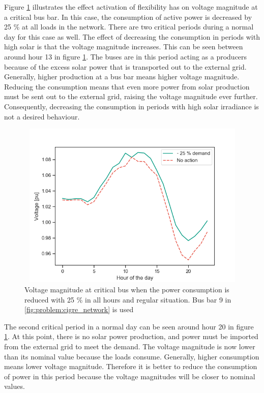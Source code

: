 \documentclass[class=book, crop=false, 11pt]{standalone}
\begin{document}
Figure \ref{fig:results:decrease_demand_voltage} illustrates the effect activation of flexibility has on voltage magnitude at a critical bus bar. In this case, the consumption of active power is decreased by 25 \% at all loads in the network. There are two critical periods during a normal day for this case as well. The effect of decreasing the consumption in periods with high solar is that the voltage magnitude increases. This can be seen between around hour 13 in figure \ref{fig:results:decrease_demand_voltage}. The buses are in this period acting as a producers because of the excess solar power that is transported out to the external grid. Generally, higher production at a bus bar means higher voltage magnitude. Reducing the consumption means that even more power from solar production must be sent out to the external grid, raising the voltage magnitude ever further. Consequently, decreasing the consumption in periods with high solar irradiance is not a desired behaviour. 

\begin{figure}[h]
    \center
\includegraphics[height=8cm, width=12cm]{figures/decrease_demand_voltage.png}
    \caption {Voltage magnitude at critical bus when the power consumption is reduced with 25 \% in all hours and regular situation. Bus bar 9 in \ref{fig:problem:cigre_network} is used}
    \label{fig:results:decrease_demand_voltage}
\end{figure}


The second critical period in a normal day can be seen around hour 20 in figure \ref{fig:results:decrease_demand_voltage}. At this point, there is no solar power production, and power must be imported from the external grid to meet the demand. The voltage magnitude is now lower than its nominal value because the loads consume. Generally, higher consumption means lower voltage magnitude. Therefore it is better to reduce the consumption of power in this period because the voltage magnitudes will be closer to nominal values.
\end{document}
